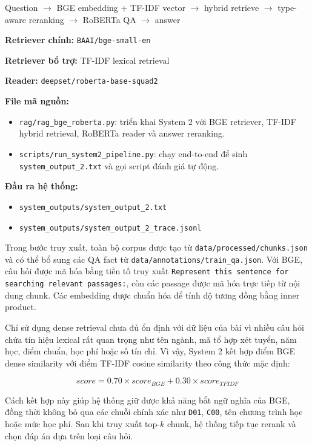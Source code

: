 \documentclass[12pt,a4paper]{report}
\begin{document}
\begin{center}
Question $\rightarrow$ BGE embedding + TF-IDF vector $\rightarrow$ hybrid retrieve $\rightarrow$ type-aware reranking $\rightarrow$ RoBERTa QA $\rightarrow$ answer
\end{center}

\textbf{Retriever chính:} \texttt{BAAI/bge-small-en}

\textbf{Retriever bổ trợ:} TF-IDF lexical retrieval

\textbf{Reader:} \texttt{deepset/roberta-base-squad2}

\textbf{File mã nguồn:}
\begin{itemize}
    \item \texttt{rag/rag\_bge\_roberta.py}: triển khai System 2 với BGE retriever, TF-IDF hybrid retrieval, RoBERTa reader và answer reranking.
    \item \texttt{scripts/run\_system2\_pipeline.py}: chạy end-to-end để sinh \texttt{system\_output\_2.txt} và gọi script đánh giá tự động.
\end{itemize}

\textbf{Đầu ra hệ thống:}
\begin{itemize}
    \item \texttt{system\_outputs/system\_output\_2.txt}
    \item \texttt{system\_outputs/system\_output\_2\_trace.jsonl}
\end{itemize}

Trong bước truy xuất, toàn bộ corpus được tạo từ \texttt{data/processed/chunks.json} và có thể bổ sung các QA fact từ \texttt{data/annotations/train\_qa.json}. Với BGE, câu hỏi được mã hóa bằng tiền tố truy xuất \texttt{Represent this sentence for searching relevant passages:}, còn các passage được mã hóa trực tiếp từ nội dung chunk. Các embedding được chuẩn hóa để tính độ tương đồng bằng inner product.

Chỉ sử dụng dense retrieval chưa đủ ổn định với dữ liệu của bài vì nhiều câu hỏi chứa tín hiệu lexical rất quan trọng như tên ngành, mã tổ hợp xét tuyển, năm học, điểm chuẩn, học phí hoặc số tín chỉ. Vì vậy, System 2 kết hợp điểm BGE dense similarity với điểm TF-IDF cosine similarity theo công thức mặc định:

\[
score = 0.70 \times score_{BGE} + 0.30 \times score_{TFIDF}
\]

Cách kết hợp này giúp hệ thống giữ được khả năng bắt ngữ nghĩa của BGE, đồng thời không bỏ qua các chuỗi chính xác như \texttt{D01}, \texttt{C00}, tên chương trình học hoặc mức học phí. Sau khi truy xuất top-\(k\) chunk, hệ thống tiếp tục rerank và chọn đáp án dựa trên loại câu hỏi.
\end{document}

